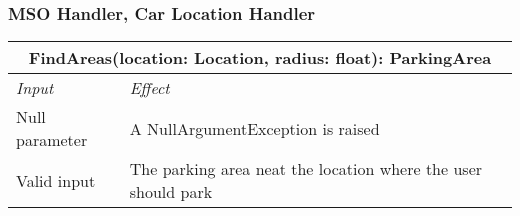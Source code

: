 			\subsubsection*{MSO Handler, Car Location Handler} 
			\begin{tabular}{ |l|l| }
				\hline
				\multicolumn{2}{|c|}{ FindAreas(location: Location, radius: float): ParkingArea}\\
				\hline
				\textit{Input}&\textit{Effect}\\ \hline
				Null parameter & A NullArgumentException is raised\\ \hline
				Valid input & The parking area neat the location where the user should park\\ \hline
			\end{tabular}
			\\
			
			
			
			
			
			
			
			
				
			
			
			
			
			
			
			
			
			